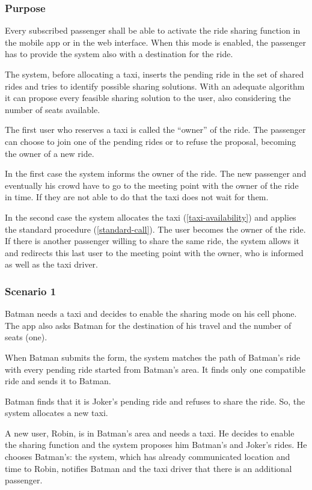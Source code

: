 \label{ride-sharing}
\subsubsection{Purpose}

Every subscribed passenger shall be able to activate the ride sharing function in the mobile app or in the web interface. When this mode is enabled, the passenger has to provide the system also with a destination for the ride.

The system, before allocating a taxi, inserts the pending ride in the set of shared rides and tries to identify possible sharing solutions.
With an adequate algorithm it can propose every feasible sharing solution to the user, also considering the number of seats available.

The first user who reserves a taxi is called the ``owner'' of the ride.
The passenger can choose to join one of the pending rides or to refuse the proposal, becoming the owner of a new ride.

In the first case the system informs the owner of the ride. The new passenger and eventually his crowd have to go to the meeting point with the owner of the ride in time. If they are not able to do that the taxi does not wait for them.

In the second case the system allocates the taxi (\ref{taxi-availability}) and applies the standard procedure (\ref{standard-call}).  The user becomes the owner of the ride.
If there is another passenger willing to share the same ride, the system allows it and redirects this last user to the meeting point with the owner, who is informed as well as the taxi driver.

\subsubsection{Scenario 1}
Batman needs a taxi and decides to enable the sharing mode on his cell phone. The app also asks Batman for the destination of his travel and the number of seats (one).

When Batman submits the form, the system matches the path of Batman's ride with every pending ride started from Batman's area. It finds only one compatible ride and sends it to Batman.

Batman finds that it is Joker's pending ride and refuses to share the ride.
So, the system allocates a new taxi.

A new user, Robin, is in Batman's area and needs a taxi. He decides to enable the sharing function and the system proposes him Batman's and Joker's rides.
He chooses Batman's: the system, which has already communicated location and time to Robin, notifies Batman and the taxi driver that there is an additional passenger.

